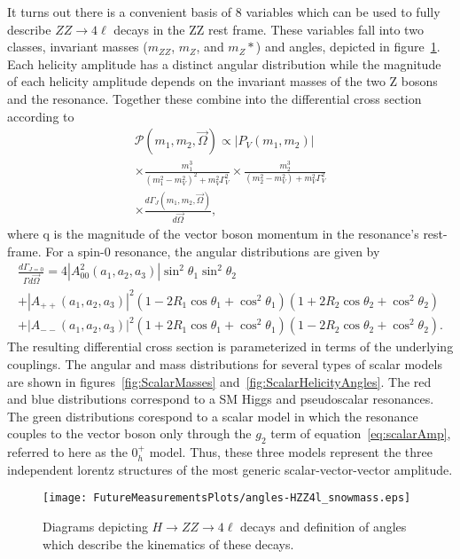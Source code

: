 It turns out there is a convenient basis of 8 variables which can be
used to fully describe $ZZ\to4\ell$ decays in the ZZ rest frame.  These
variables fall into two classes, invariant masses ($m_{ZZ}$, $m_Z$, and 
$m_Z*$) and angles, depicted in figure~\ref{fig:HZZdiagram}.
Each helicity amplitude has a distinct angular distribution while the
magnitude of each helicity amplitude depends on the invariant masses 
of the two Z bosons and the resonance.  Together these combine into the
differential cross section according to
\begin{equation}
\begin{split}
\mathscr{P}(m_1,m_2,\vec{\Omega})\propto|P_V(m_1,m_2)|  \\
\times\frac{m_1^3}{(m_1^2-m_V^2)^2+m_V^2\Gamma_V^2}\times\frac{m_2^3}{(m_2^2-m_V^2)+m_V^2\Gamma_V^2} \\
\times\frac{d\Gamma_J(m_1,m_2,\vec{\Omega})}{d\vec{\Omega}},
\end{split}
\end{equation}
where q is the magnitude of the vector boson momentum in the resonance's rest-frame.
For a spin-0 resonance, the angular distributions are given 
by
\begin{equation}
\begin{split}
\frac{d\Gamma_{J=0}}{\Gamma d\vec{\Omega}} = 4|A_{00}^2(a_1,a_2,a_3)|\sin^2\theta_1\sin^2\theta_2 \\
+|A_{++}(a_1,a_2,a_3)|^2(1-2R_1\cos\theta_1+\cos^2\theta_1)(1+2R_{2}\cos\theta_2+\cos^2\theta_2)\\
+|A_{--}(a_1,a_2,a_3)|^2(1+2R_1\cos\theta_1+\cos^2\theta_1)(1-2R_{2}\cos\theta_2+\cos^2\theta_2).  
\end{split}
\end{equation}
The resulting differential cross section is parameterized in terms of 
the underlying couplings. 
The angular and mass distributions for several types of scalar 
models are shown in figures~\ref{fig:ScalarMasses} 
and~\ref{fig:ScalarHelicityAngles}.  The red and blue distributions
correspond to a SM Higgs and pseudoscalar resonances.  The green 
distributions corespond to a scalar model in which the resonance couples
to the vector boson only through the $g_2$ term of 
equation~\ref{eq:scalarAmp}, referred to here as
the $0_{h}^+$ model.  Thus, these three models 
represent the three independent lorentz structures of the most generic
scalar-vector-vector amplitude.  

\begin{figure}
\begin{center}
\texttt{[image: FutureMeasurementsPlots/angles-HZZ4l\_snowmass.eps]}
\caption{Diagrams depicting $H\to ZZ\to4\ell$ decays and definition
of angles which describe the kinematics of these decays.}
\label{fig:HZZdiagram}
\end{center}
\end{figure}


